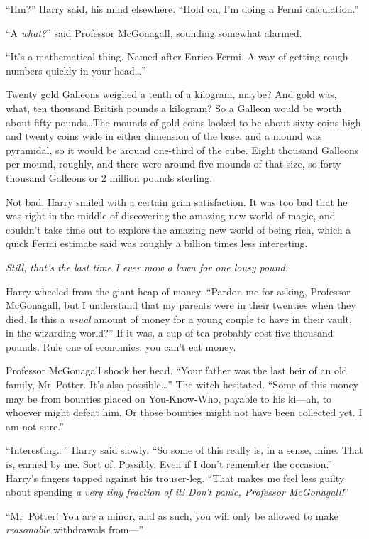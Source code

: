 “Hm?” Harry said, his mind elsewhere. “Hold on, I’m doing a Fermi calculation.”

“A \emph{what?}” said Professor McGonagall, sounding somewhat alarmed.

“It’s a mathematical thing. Named after Enrico Fermi. A way of getting rough numbers quickly in your head…”

Twenty gold Galleons weighed a tenth of a kilogram, maybe? And gold was, what, ten thousand British pounds a kilogram? So a Galleon would be worth about fifty pounds…The mounds of gold coins looked to be about sixty coins high and twenty coins wide in either dimension of the base, and a mound was pyramidal, so it would be around one-third of the cube. Eight thousand Galleons per mound, roughly, and there were around five mounds of that size, so forty thousand Galleons or 2 million pounds sterling.

Not bad. Harry smiled with a certain grim satisfaction. It was too bad that he was right in the middle of discovering the amazing new world of magic, and couldn’t take time out to explore the amazing new world of being rich, which a quick Fermi estimate said was roughly a billion times less interesting.

\emph{Still, that’s the last time I ever mow a lawn for one lousy pound.}

Harry wheeled from the giant heap of money. “Pardon me for asking, Professor McGonagall, but I understand that my parents were in their twenties when they died. Is this a \emph{usual} amount of money for a young couple to have in their vault, in the wizarding world?” If it was, a cup of tea probably cost five thousand pounds. Rule one of economics: you can’t eat money.

Professor McGonagall shook her head. “Your father was the last heir of an old family, Mr~Potter. It’s also possible…” The witch hesitated. “Some of this money may be from bounties placed on You-Know-Who, payable to his ki—ah, to whoever might defeat him. Or those bounties might not have been collected yet. I am not sure.”

“Interesting…” Harry said slowly. “So some of this really is, in a sense, mine. That is, earned by me. Sort of. Possibly. Even if I don’t remember the occasion.” Harry’s fingers tapped against his trouser-leg. “That makes me feel less guilty about spending \emph{a very tiny fraction of it! Don’t panic, Professor McGonagall!}”

“Mr~Potter! You are a minor, and as such, you will only be allowed to make \emph{reasonable} withdrawals from—”

